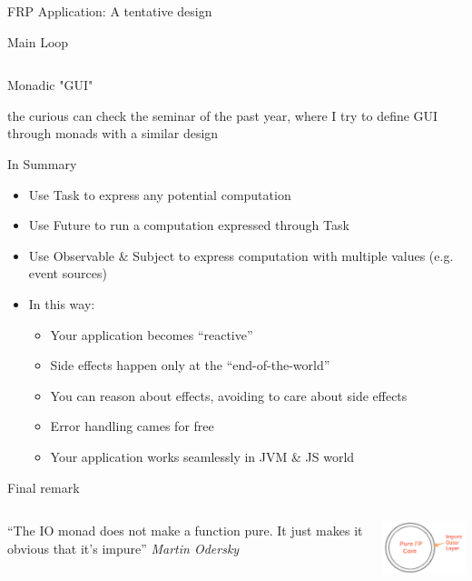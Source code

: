 \documentclass[presentation, 9pt]{beamer}\mode<presentation>{\usetheme{AMSBolognaFC}}
\begin{document}
\begin{frame}{FRP Application: A tentative design \href{https://github.com/cric96/scala-frp-gui}{\faLink}}
\begin{alertblock}{Main Loop}
\begin{tcolorbox}[left=0pt, top=0pt, bottom=0pt]
\begin{verbatim}
					\end{verbatim}
					\end{tcolorbox}
				\end{alertblock}	
				\begin{alertblock}{Monadic "GUI"}

the curious can check the seminar of the past year, where I try to define GUI through monads with a similar design \href{https://github.com/cric96/MVC-meets-monad/releases/tag/0.1.0-2021-06-04T085146}{\faLink}
				\end{alertblock}
\end{frame}
\begin{frame}[fragile]{In Summary}
	\begin{itemize}
		\item Use Task to express any potential computation
  	\item Use Future to run a computation expressed through Task 
   	\item Use Observable \& Subject to express computation with multiple values (e.g. event sources)
    \item In this way:
    \begin{itemize}
			\item Your application becomes ``reactive''
   		\item Side effects happen only at the ``end-of-the-world''
     \item You can reason about effects, avoiding to care about side effects
     \item Error handling cames for free
     \item Your application works seamlessly in JVM \& JS world
		\end{itemize}
	\end{itemize}
	\begin{alertblock}{Final remark}
		\begin{columns}
			\begin{column}[c]{0.4\textwidth}
				``The IO monad does not make a function pure. It just makes it obvious that it's impure''
				\emph{Martin Odersky}
			\end{column}
			\begin{column}[c]{0.4\textwidth}

	\includegraphics[width=4cm]{img/pure-impure.png}
			\end{column}
		\end{columns}
	\end{alertblock}
\end{frame}
\end{document}

